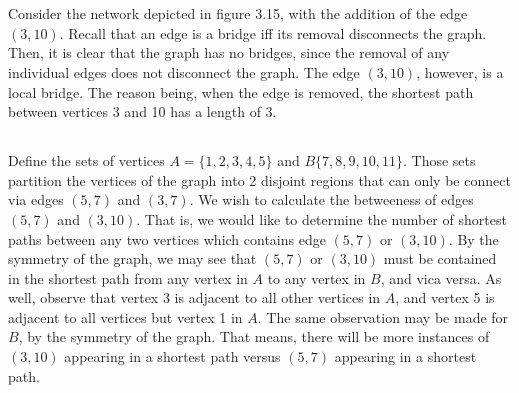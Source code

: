 \documentclass[12pt]{article}
\begin{document}
\section{}
\subsection{}
Consider the network depicted in figure 3.15, with the addition of the edge $(3,10)$. Recall that an edge is a bridge iff its removal disconnects the graph. Then, it is clear that the graph has no bridges, since the removal of any individual edges does not disconnect the graph. The edge $(3,10)$, however, is a local bridge. The reason being, when the edge is removed, the shortest path between vertices 3 and 10 has a length of 3. 
\subsection{}
Define the sets of vertices $A = \{1,2,3,4,5 \}$ and $B \{7,8,9,10,11\}$. Those sets partition the vertices of the graph into 2 disjoint regions that can only be connect via edges $(5,7)$ and $(3,7)$. 
\newline 
\newline
We wish to calculate the betweeness of edges $(5,7)$ and $(3,10)$. That is, we would like to determine the number of shortest paths between any two vertices which contains edge $(5,7)$ or $(3,10)$. By the symmetry of the graph, we may see that $(5,7)$ or $(3,10)$ must be contained in the shortest path from any vertex in $A$ to any vertex in $B$, and vica versa. As well, observe that vertex 3 is adjacent to all other vertices in $A$, and vertex 5 is adjacent to all vertices but vertex 1 in $A$. The same observation may be made for $B$, by the symmetry of the graph. That means, there will be more instances of $(3,10)$ appearing in a shortest path versus $(5,7)$ appearing in a shortest path. 
\newline 
\newline 
\end{document}
